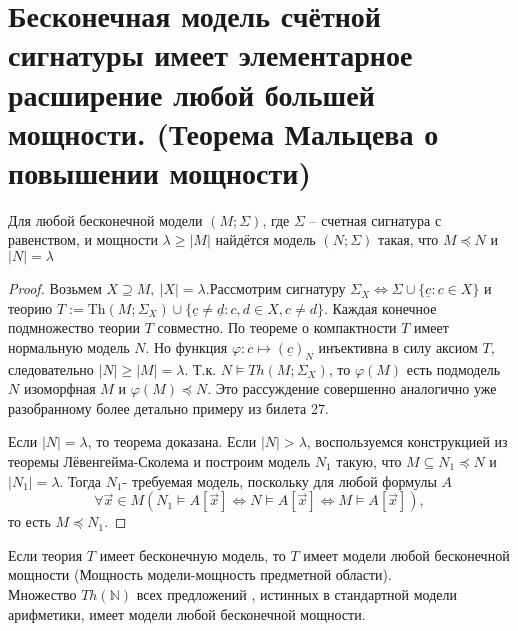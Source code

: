 \section{Бесконечная модель счётной сигнатуры имеет элементарное расширение
любой большей мощности. (Теорема Мальцева о повышении мощности)}
\begin{theorem} 
	Для любой бесконечной модели $(M ;\Sigma)$, где $\Sigma$ -- счетная сигнатура с равенством, и мощности $\lambda
	\ge |M|$ найдётся модель $(N ;\Sigma)$ такая, что $M \preccurlyeq N$ и $|N|=\lambda$
\end{theorem}
\begin{proof}
	Возьмем $ X \supseteq M,\:|X|=\lambda$.Рассмотрим сигнатуру $\Sigma_X \Longleftrightarrow \Sigma
	\cup\{\underline{c}: c \in X\}$ и теорию $T:=\mathrm{Th}\left(M;\Sigma_{X}\right) \cup\{\underline{c} \neq
	\underline{d}: c, d \in X, c \neq d\}$. Каждая конечное подмножество теории $T$ совместно. По теореме о
	компактности $T$ имеет нормальную модель $N$. Но функция $\varphi\colon c \mapsto(\underline{c})_{N}$
	инъективна в силу аксиом $T$, следовательно $|N|\ge |M|=\lambda$. Т.к. $N\vDash Th(M;\Sigma_X)$, то
	$\varphi(M)$ есть подмодель $N$ изоморфная $M$ и $\varphi(M)\preccurlyeq N$. Это рассуждение совершенно
	аналогично уже разобранному более детально примеру из билета 27.

	Если $|N|=\lambda$, то теорема доказана. Если $|N|>\lambda$, воспользуемся конструкцией из теоремы
	Лёвенгейма-Сколема и построим модель $N_1$ такую, что $M \subseteq N_{1} \preccurlyeq N$ и
	$\left|N_{1}\right|=\lambda$. Тогда $N_1$- требуемая модель, поскольку для любой формулы $A$
	$$\forall \vec{x} \in M\left(N_{1} \vDash A[\vec{x}] \Longleftrightarrow N \vDash A[\vec{x}]
	\Longleftrightarrow M \vDash A[\vec{x}]\right),$$ то есть $M \preccurlyeq N_1$.
\end{proof}
\begin{corollary}
	Если теория $T$ имеет бесконечную модель, то $T$ имеет модели любой бесконечной мощности (Мощность
	модели-мощность предметной области).\\ 
	Множество $Th(\mathbb{N})$ всех предложений , истинных в стандартной модели арифметики, имеет модели любой
	бесконечной мощности.
\end{corollary}
